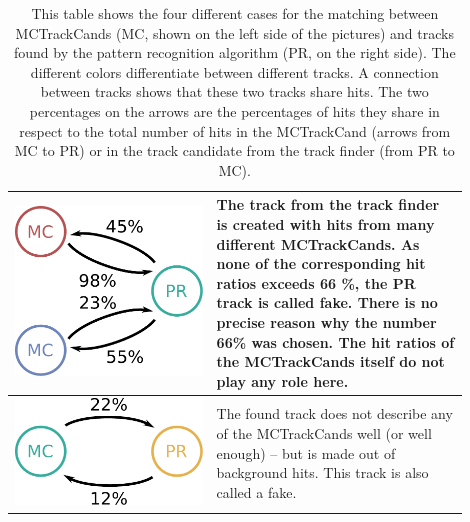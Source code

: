 \begin{table}
\begin{tabular}{m{0.4\linewidth}m{0.5\linewidth}}
    \centering \includegraphics[width=0.8\linewidth]{figures/theory/fom_fake.pdf} & The track from the track finder is created with hits from many different MCTrackCands. As none of the corresponding hit ratios exceeds 66 \%, the PR track is called fake. There is no precise reason why the number 66\% was chosen. The hit ratios of the MCTrackCands itself do not play any role here. \\  \midrule
    \centering \includegraphics[width=0.8\linewidth]{figures/theory/fom_background.pdf} & The found track does not describe any of the MCTrackCands well (or well enough) -- but is made out of background hits. This track is also called a fake. \\ \bottomrule
  \end{tabular}
  \caption[Matching routine for compiling the FOM.]{This table shows the four different cases for the matching between MCTrackCands (MC, shown on the left side of the pictures) and tracks found by the pattern recognition algorithm (PR, on the right side). The different colors differentiate between different tracks. A connection between tracks shows that these two tracks share hits. The two percentages on the arrows are the percentages of hits they share in respect to the total number of hits in the MCTrackCand (arrows from MC to PR) or in the track candidate from the track finder (from PR to MC).}
  \label{tab-mc-track-finder}
\end{table}

